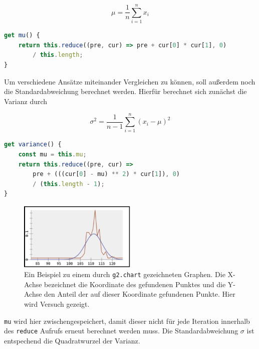 \begin{equation}
    \mu = \frac{1}{n} \sum_{i=1}^n{x_i}
\end{equation}

\begin{lstlisting}[language=JavaScript, caption={Definition der \lstinline{mu} Funktion, welche den Erwartungswert der Daten in \lstinline{Data} berechnet.},label={lst:data_mu}]
get mu() {
    return this.reduce((pre, cur) => pre + cur[0] * cur[1], 0)
        / this.length;
}
\end{lstlisting}

Um verschiedene Ansätze miteinander Vergleichen zu können, soll au{\ss}erdem noch die Standardabweichung berechnet werden.
Hierfür berechnet sich zunächst die Varianz durch

\begin{equation}
    \sigma^2 = \frac{1}{n - 1} \sum_{i=1}^n(x_i - \mu)^2
\end{equation}

\begin{lstlisting}[language=JavaScript, caption={Definition der \lstinline{variance} Funktion, welche die Varianz der Daten in \lstinline{Data} berechnet.}, label={lst:data_variance}]
get variance() {
    const mu = this.mu;
    return this.reduce((pre, cur) =>
        pre + (((cur[0] - mu) ** 2) * cur[1]), 0)
        / (this.length - 1);
}
\end{lstlisting}

\begin{figure}
    \centering
    \includegraphics[width=0.5\textwidth]{gfx/normalverteilung.png}
    \caption[Beispiel für in etwa normal verteilte Daten.]{Ein Beispiel zu einem durch \lstinline{g2.chart} gezeichneten Graphen. Die X-Achse bezeichnet die Koordinate des gefundenen Punktes und die Y-Achse den Anteil der auf dieser Koordinate gefundenen Punkte. Hier wird Versuch  gezeigt.}
    \label{fig:normalverteilung}
\end{figure}

\lstinline{mu} wird hier zwischengespeichert, damit dieser nicht für jede Iteration innerhalb des \lstinline{reduce} Aufrufs erneut berechnet werden muss.
Die Standardabweichung $\sigma$ ist entspechend die Quadratwurzel der Varianz.

